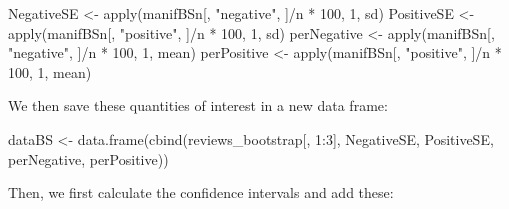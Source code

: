 \documentclass[
]{book}
\newenvironment{Shaded}{\begin{snugshade}}{\end{snugshade}}
\newcommand{\DecValTok}[1]{\textcolor[rgb]{0.00,0.00,0.81}{#1}}
\newcommand{\FloatTok}[1]{\textcolor[rgb]{0.00,0.00,0.81}{#1}}
\newcommand{\FunctionTok}[1]{\textcolor[rgb]{0.00,0.00,0.00}{#1}}
\newcommand{\NormalTok}[1]{#1}
\newcommand{\OtherTok}[1]{\textcolor[rgb]{0.56,0.35,0.01}{#1}}
\newcommand{\SpecialCharTok}[1]{\textcolor[rgb]{0.00,0.00,0.00}{#1}}
\newcommand{\StringTok}[1]{\textcolor[rgb]{0.31,0.60,0.02}{#1}}
\begin{document}
\begin{Shaded}
\begin{Highlighting}[]
\NormalTok{NegativeSE }\OtherTok{\textless{}{-}} \FunctionTok{apply}\NormalTok{(manifBSn[, }\StringTok{"negative"}\NormalTok{, ]}\SpecialCharTok{/}\NormalTok{n }\SpecialCharTok{*} \DecValTok{100}\NormalTok{, }\DecValTok{1}\NormalTok{, sd)}
\NormalTok{PositiveSE }\OtherTok{\textless{}{-}} \FunctionTok{apply}\NormalTok{(manifBSn[, }\StringTok{"positive"}\NormalTok{, ]}\SpecialCharTok{/}\NormalTok{n }\SpecialCharTok{*} \DecValTok{100}\NormalTok{, }\DecValTok{1}\NormalTok{, sd)}
\NormalTok{perNegative }\OtherTok{\textless{}{-}} \FunctionTok{apply}\NormalTok{(manifBSn[, }\StringTok{"negative"}\NormalTok{, ]}\SpecialCharTok{/}\NormalTok{n }\SpecialCharTok{*} \DecValTok{100}\NormalTok{, }\DecValTok{1}\NormalTok{, mean)}
\NormalTok{perPositive }\OtherTok{\textless{}{-}} \FunctionTok{apply}\NormalTok{(manifBSn[, }\StringTok{"positive"}\NormalTok{, ]}\SpecialCharTok{/}\NormalTok{n }\SpecialCharTok{*} \DecValTok{100}\NormalTok{, }\DecValTok{1}\NormalTok{, mean)}
\end{Highlighting}
\end{Shaded}

We then save these quantities of interest in a new data frame:

\begin{Shaded}
\begin{Highlighting}[]
\NormalTok{dataBS }\OtherTok{\textless{}{-}} \FunctionTok{data.frame}\NormalTok{(}\FunctionTok{cbind}\NormalTok{(reviews\_bootstrap[, }\DecValTok{1}\SpecialCharTok{:}\DecValTok{3}\NormalTok{], NegativeSE, }
\NormalTok{    PositiveSE, perNegative, perPositive))}
\end{Highlighting}
\end{Shaded}

Then, we first calculate the confidence intervals and add these:

\begin{Shaded}
\end{Shaded}
\end{document}
